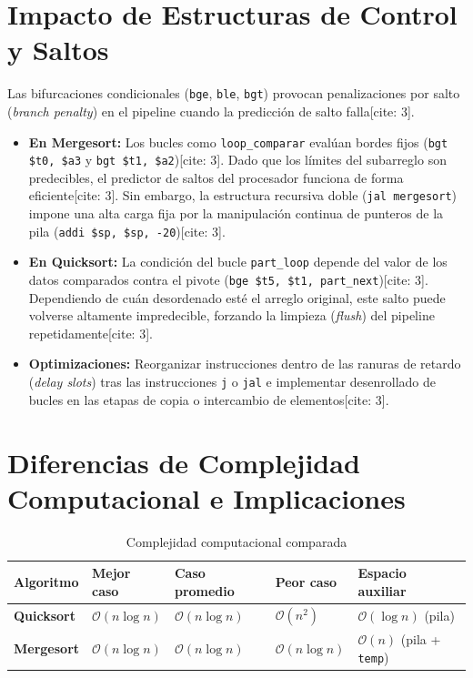 \documentclass[12pt,a4paper]{article}
\begin{document}
\section{Impacto de Estructuras de Control y Saltos}

Las bifurcaciones condicionales (\texttt{bge}, \texttt{ble}, \texttt{bgt}) provocan penalizaciones por salto (\textit{branch penalty}) en el pipeline cuando la predicción de salto falla[cite: 3].

\begin{itemize}
    \item \textbf{En Mergesort:} Los bucles como \texttt{loop\_comparar} evalúan bordes fijos (\texttt{bgt \$t0, \$a3} y \texttt{bgt \$t1, \$a2})[cite: 3]. Dado que los límites del subarreglo son predecibles, el predictor de saltos del procesador funciona de forma eficiente[cite: 3]. Sin embargo, la estructura recursiva doble (\texttt{jal mergesort}) impone una alta carga fija por la manipulación continua de punteros de la pila (\texttt{addi \$sp, \$sp, -20})[cite: 3].
    \item \textbf{En Quicksort:} La condición del bucle \texttt{part\_loop} depende del valor de los datos comparados contra el pivote (\texttt{bge \$t5, \$t1, part\_next})[cite: 3]. Dependiendo de cuán desordenado esté el arreglo original, este salto puede volverse altamente impredecible, forzando la limpieza (\textit{flush}) del pipeline repetidamente[cite: 3].
    \item \textbf{Optimizaciones:} Reorganizar instrucciones dentro de las ranuras de retardo (\textit{delay slots}) tras las instrucciones \texttt{j} o \texttt{jal} e implementar desenrollado de bucles en las etapas de copia o intercambio de elementos[cite: 3].
\end{itemize}


\section{Diferencias de Complejidad Computacional e Implicaciones}

\begin{table}[h!]
\centering
\caption{Complejidad computacional comparada}
\vspace{0.2cm}
\begin{tabular}{lllll}
\toprule
\textbf{Algoritmo} & \textbf{Mejor caso} & \textbf{Caso promedio} & \textbf{Peor caso} & \textbf{Espacio auxiliar} \\
\midrule
\textbf{Quicksort} & $\mathcal{O}(n \log n)$ & $\mathcal{O}(n \log n)$ & $\mathcal{O}(n^2)$ & $\mathcal{O}(\log n)$ (pila) \\
\textbf{Mergesort} & $\mathcal{O}(n \log n)$ & $\mathcal{O}(n \log n)$ & $\mathcal{O}(n \log n)$ & $\mathcal{O}(n)$ (pila + \texttt{temp}) \\
\bottomrule
\end{tabular}
\end{table}
\end{document}
